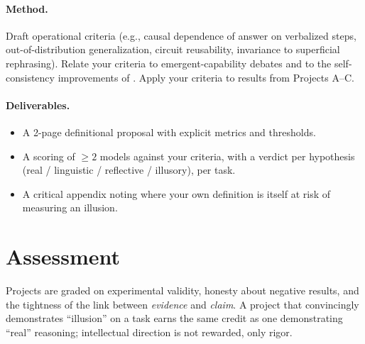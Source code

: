\documentclass[11pt]{article}
\begin{document}
\paragraph{Method.} Draft operational criteria (e.g., causal dependence of
answer on verbalized steps, out-of-distribution generalization, circuit
reusability, invariance to superficial rephrasing). Relate your criteria to
emergent-capability debates \citep{wei2022emergent, schaeffer2023mirage} and
to the self-consistency improvements of \citet{wang2023selfconsistency}.
Apply your criteria to results from Projects A--C.

\paragraph{Deliverables.}
\begin{itemize}[leftmargin=1.4em]
  \item A 2-page definitional proposal with explicit metrics and thresholds.
  \item A scoring of $\geq 2$ models against your criteria, with a verdict
    per hypothesis (real / linguistic / reflective / illusory), per task.
  \item A critical appendix noting where your own definition is itself at
    risk of measuring an illusion.
\end{itemize}

\section*{Assessment}

Projects are graded on experimental validity, honesty about negative
results, and the tightness of the link between \emph{evidence} and
\emph{claim}. A project that convincingly demonstrates ``illusion'' on a
task earns the same credit as one demonstrating ``real'' reasoning;
intellectual direction is not rewarded, only rigor.
\end{document}
